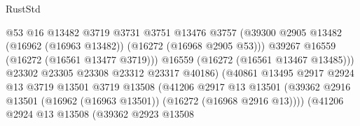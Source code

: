 \begin{lexlean}{RustStd}
\begin{coremodule}
                                              @53
                                              @16
                                              @13482
                                              @3719
                                              @3731
                                              @3751
                                              @13476
                                              @3757
                                              (@39300
                                                @2905
                                                @13482
                                                (@16962 (@16963 @13482))
                                                (@16272 (@16968 @2905 @53)))
                                              @39267
                                              @16559
                                              (@16272 (@16561 @13477 @3719)))
                                            @16559
                                            (@16272 (@16561 @13467 @13485)))
                                          @23302
                                          @23305
                                          @23308
                                          @23312
                                          @23317
                                          @40186)
                                        (@40861
                                          @13495
                                          @2917
                                          @2924
                                          @13
                                          @3719
                                          @13501
                                          @3719
                                          @13508
                                          (@41206
                                            @2917
                                            @13
                                            @13501
                                            (@39362
                                              @2916
                                              @13501
                                              (@16962 (@16963 @13501))
                                              (@16272 (@16968 @2916 @13))))
                                          (@41206
                                            @2924
                                            @13
                                            @13508
                                            (@39362
                                              @2923
                                              @13508

\end{coremodule}
\end{lexlean}
